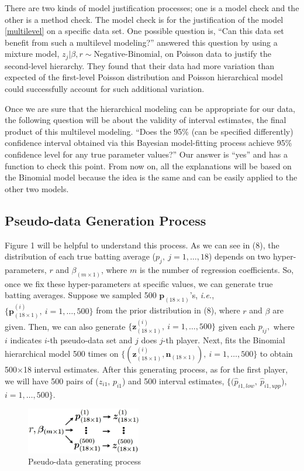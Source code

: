 \documentclass[article]{jss}
\begin{document}
There are two kinds of model justification processes; one is a model check and the other is a method check. The model check is for the justification of the model \ref{multilevel} on a specific data set. One possible question is, ``Can this data set benefit from such a multilevel modeling?'' \cite{1997} answered this question by using a mixture model, $z_{j}\vert \beta, r\sim\textrm{Negative-Binomial}$, on Poisson data to justify the second-level hierarchy. They found that their data had more variation than expected of the first-level Poisson distribution and Poisson hierarchical model could successfully account for such additional variation.


Once we are sure that the hierarchical modeling can be appropriate for our data, the following question will be about the validity of interval estimates, the final product of this multilevel modeling. ``Does the 95\% (can be specified differently) confidence interval obtained via this Bayesian model-fitting process achieve 95\% confidence level  for any true parameter values?'' Our answer is ``yes'' and  has a function to check this point. From now on, all the explanations will be based on the Binomial model because the idea is the same and can be easily applied to the other two models.

\subsection{Pseudo-data Generation Process}
Figure 1 will be helpful to understand this process. As we can see in (8), the distribution of each true batting average ($p_{j},~j=1,\ldots, 18$) depends on two hyper-parameters, $r$ and $\beta_{(m\times1)}$, where $m$ is the number of regression coefficients. So, once we fix these hyper-parameters at specific values, we can generate true batting averages. Suppose we sampled 500 $\mathbf{p}_{(18\times1)}$'s, \emph{i.e.}, $\{\mathbf{p}^{(i)}_{(18\times1)},~i=1, \ldots, 500\}$ from the prior distribution in (8), where $r$ and $\beta$ are given. Then, we can also generate $\{\mathbf{z}^{(i)}_{(18\times1)},~i=1, \ldots, 500\}$ given each $p_{ij},$ where $i$ indicates $i$-th pseudo-data set and $j$ does $j$-th player. Next,  fits the Binomial hierarchical model 500 times on $\{(\mathbf{z}^{(i)}_{(18\times1)}, \mathbf{n}_{(18 \times 1)}),~i=1, \ldots, 500\}$ to obtain 500$\times$18 interval estimates.  After this generating process, as for the first player, we will have 500 pairs of ($z_{i1}$, $p_{i1}$) and 500 interval estimates, $\{(\hat{p}_{i1, low}, ~\hat{p}_{i1, upp}$), $i=1, \ldots, 500\}$.
\begin{figure}[h]
\begin{center}
\includegraphics[width=5cm]{process.png}
\caption{Pseudo-data generating process}
\end{center}
\end{figure}
\end{document}
